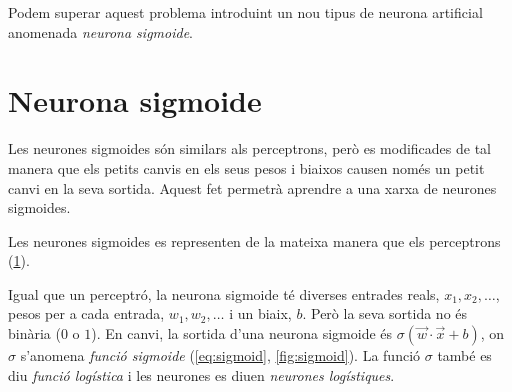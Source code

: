\begin{refsection}
	Podem superar aquest problema introduint un nou tipus de neurona artificial anomenada \textit{neurona sigmoide}.
	
	\section{Neurona sigmoide}
	
	Les neurones sigmoides són similars als perceptrons, però es modificades de tal manera que els petits canvis en els seus pesos i biaixos causen només un petit canvi en la seva sortida. Aquest fet permetrà aprendre a una xarxa de neurones sigmoides.\supercite{TDSsigmoid}
	
	Les neurones sigmoides es representen de la mateixa manera que els perceptrons (\cref{fig:neuron}).
	
	\begin{figure}[h]
		\centering
		\label{fig:neuron}
	\end{figure}

	Igual que un perceptró, la neurona sigmoide té diverses entrades reals, $x_1,x_2,\ldots$, pesos per a cada entrada, $w_1,w_2,\ldots$ i un biaix, $b$. Però la seva sortida no és binària ($0$ o $1$). En canvi, la sortida d'una neurona sigmoide és $\sigma(\vec{w}\cdot\vec{x}+b)$, on $\sigma$ s'anomena \textit{funció sigmoide} (\cref{eq:sigmoid}, \cref{fig:sigmoid}). La funció $\sigma$ també es diu \textit{funció logística} i les neurones es diuen \textit{neurones logístiques}.
	

\end{refsection}

